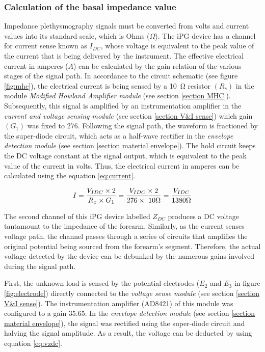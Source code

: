 \subsubsection{Calculation of the basal impedance value}
Impedance plethysmography signals must be converted from volts and current values into its standard scale, which is Ohms ($\Omega$). The iPG device has a channel for current sense known as $I_{DC}$, whose voltage is equivalent to the peak value of the current that is being delivered by the instrument. The effective electrical current in amperes ($A$) can be calculated by the gain relation of the various stages of the signal path. In accordance to the circuit schematic (see figure \ref{fig:mhc}), the electrical current is being sensed by a \SI{10}{\ohm} resistor $(R_s)$ in the module \textit{Modified Howland Amplifier module} (see section \ref{section MHC}). Subsequently, this signal is amplified by an instrumentation amplifier in the \textit{current and voltage sensing module} (see section \ref{section V&I sense}) which gain $(G_1)$ was fixed to \num{276}. Following the signal path, the waveform is fractioned by the super-diode circuit, which acts as a half-wave rectifier in the \textit{envelope detection module} (see section \ref{section material envelope}). The hold circuit keeps the DC voltage constant at the signal output, which is equivalent to the peak value of the current in volts. Thus, the electrical current in amperes can be calculated using the equation \ref{eq:current}.

\begin{align}
	\label{eq:current}
	I = \frac{V_{IDC} \times 2}{R_x \times G_1} = \frac{V_{IDC} \times 2}{276 \times\ 10 \Omega} = \frac{V_{IDC}}{1380 \Omega} \tagaddtext{[\si{\ampere}]}
\end{align}

The second channel of this iPG device labelled $Z_{DC}$ produces a DC voltage tantamount to the impedance of the forearm. Similarly, as the current senses voltage path, the channel passes through a series of circuits that amplifies the original potential being sourced from the forearm's segment. Therefore, the actual voltage detected by the device can be debunked by the numerous gains involved during the signal path. 

First, the unknown load is sensed by the potential electrodes ($E_2$ and $E_3$ in figure \ref{fig:electrode}) directly connected to the \textit{voltage sense module} (see section \ref{section V&I sense}). The instrumentation amplifier (AD8421) of this module was configured to a gain \num{35.65}. In the \textit{envelope detection module} (see section \ref{section material envelope}), the signal was rectified using the super-diode circuit and halving the signal amplitude. As a result, the voltage can be deducted by using equation \ref{eq:vzdc}.

